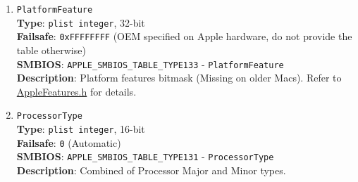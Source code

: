 \documentclass[]{article}
\begin{document}
\begin{enumerate}
  \texttt{FirmwareFeaturesMask} and
  \texttt{ExtendedFirmwareFeaturesMask}\\
  \textbf{Description}: Supported bits of extended firmware features
  bitmask. Refer to
  \href{https://github.com/acidanthera/OpenCorePkg/blob/master/Include/Apple/IndustryStandard/AppleFeatures.h}{AppleFeatures.h}
  for details. Lower 32 bits match \texttt{FirmwareFeaturesMask}.
  Upper 64 bits match \texttt{ExtendedFirmwareFeaturesMask}.
\item
  \texttt{PlatformFeature}\\
  \textbf{Type}: \texttt{plist\ integer}, 32-bit\\
  \textbf{Failsafe}: \texttt{0xFFFFFFFF} (OEM specified on Apple hardware, do not provide the table otherwise)\\
  \textbf{SMBIOS}: \texttt{APPLE\_SMBIOS\_TABLE\_TYPE133} -
  \texttt{PlatformFeature}\\
  \textbf{Description}: Platform features bitmask (Missing on older Macs). Refer to
  \href{https://github.com/acidanthera/OpenCorePkg/blob/master/Include/Apple/IndustryStandard/AppleFeatures.h}{AppleFeatures.h} for details.
\item
  \texttt{ProcessorType}\\
  \textbf{Type}: \texttt{plist\ integer}, 16-bit\\
  \textbf{Failsafe}: \texttt{0} (Automatic)\\
  \textbf{SMBIOS}: \texttt{APPLE\_SMBIOS\_TABLE\_TYPE131} -
  \texttt{ProcessorType}\\
  \textbf{Description}: Combined of Processor Major and Minor types.


\end{enumerate}
\end{document}
